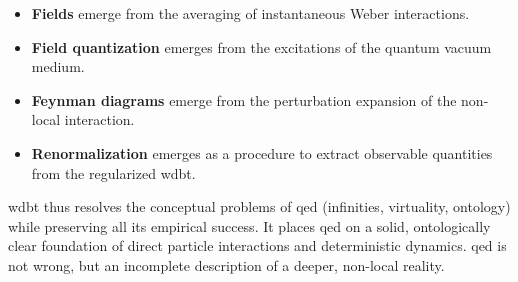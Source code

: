 \begin{itemize}
    \item \textbf{Fields} emerge from the averaging of instantaneous Weber interactions.
    \item \textbf{Field quantization} emerges from the excitations of the quantum vacuum medium.
    \item \textbf{Feynman diagrams} emerge from the perturbation expansion of the non-local interaction.
    \item \textbf{Renormalization} emerges as a procedure to extract observable quantities from the regularized \gls{wdbt}.
\end{itemize}

\gls{wdbt} thus resolves the conceptual problems of \gls{qed} (infinities, virtuality, ontology) while preserving all its empirical success. It places \gls{qed} on a solid, ontologically clear foundation of direct particle interactions and deterministic dynamics. \gls{qed} is not wrong, but an incomplete description of a deeper, non-local reality.